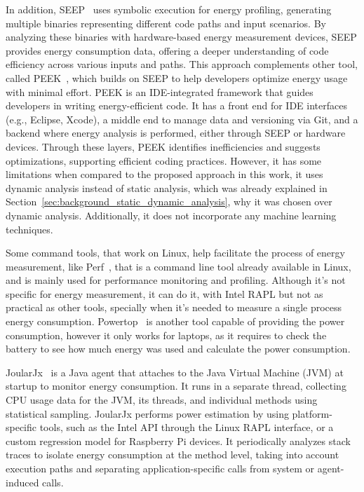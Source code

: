 In addition, SEEP~\cite{10.1145/2094091.2094106} uses symbolic execution for energy profiling, generating multiple binaries representing different code paths and input scenarios. By analyzing these binaries with hardware-based energy measurement devices, SEEP provides energy consumption data, offering a deeper understanding of code efficiency across various inputs and paths. This approach complements other tool, called PEEK~\cite{187026}, which builds on SEEP to help developers optimize energy usage with minimal effort. PEEK is an IDE-integrated framework that guides developers in writing energy-efficient code. It has a front end for IDE interfaces (e.g., Eclipse, Xcode), a middle end to manage data and versioning via Git, and a backend where energy analysis is performed, either through SEEP or hardware devices. Through these layers, PEEK identifies inefficiencies and suggests optimizations, supporting efficient coding practices. However, it has some limitations when compared to the proposed approach in this work, it uses dynamic analysis instead of static analysis, which was already explained in Section~\ref{sec:background_static_dynamic_analysis}, why it was chosen over dynamic analysis. Additionally, it does not incorporate any machine learning techniques.

Some command tools, that work on Linux, help facilitate the process of energy measurement, like Perf~\cite{perfwiki_main}, that is a command line tool already available in Linux, and is mainly used for performance monitoring and profiling. Although it's not specific for energy measurement, it can do it, with Intel RAPL but not as practical as other tools, specially when it's needed to measure a single process energy consumption. Powertop~\cite{archlinux_powertop} is another tool capable of providing the power consumption, however it only works for laptops, as it requires to check the battery to see how much energy was used and calculate the power consumption.

JoularJx~\cite{noureddine-ie-2022} is a Java agent that attaches to the Java Virtual Machine (JVM) at startup to monitor energy consumption. It runs in a separate thread, collecting CPU usage data for the JVM, its threads, and individual methods using statistical sampling. JoularJx performs power estimation by using platform-specific tools, such as the Intel API through the Linux RAPL interface, or a custom regression model for Raspberry Pi devices. It periodically analyzes stack traces to isolate energy consumption at the method level, taking into account execution paths and separating application-specific calls from system or agent-induced calls.

